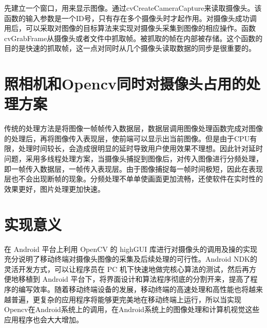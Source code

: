 \documentclass{XDBAthesis}
\begin{document}
先建立一个窗口，用来显示图像。通过cvCreateCameraCapture来读取摄像头。该函数的输入参数是一个ID号，只有存在多个摄像头时才起作用。对摄像头成功调用后，可以采取对图像的目标算法来实现对摄像头采集到图像的相应操作。函数cvGrabFrame从摄像头或者文件中抓取帧。被抓取的帧在内部被存储。这个函数的目的是快速的抓取帧，这一点对同时从几个摄像头读取数据的同步是很重要的。

\section{照相机和Opencv同时对摄像头占用的处理方案}

    传统的处理方法是将图像一帧帧传入数据层，数据层调用图像处理函数完成对图像的处理后，再将图像传入表现层，使前端可以显示出当前图像。但是由于CPU有限，处理时间较长，会造成很明显的延时导致用户使用效果不理想。因此针对延时问题，采用多线程处理方案，当摄像头捕捉到图像后，对传入图像进行分频处理，即一帧传入数据层，一帧传入表现层。由于图像捕捉每一帧时间极短，因此在表现层也不会出现断帧的现象。分频处理不单单使画面更加流畅，还使软件在实时性的效果更好，图片处理更加快速。

\section{实现意义}

   在 Android 平台上利用 OpenCV 的 highGUI 库进行对摄像头的调用及操的实现充分说明了移动终端对摄像头图像的采集及后续处理的可行性。Android NDK的灵活开发方式，可以让程序员在 PC 机下快速地做完核心算法的测试，然后再方便地移植到 Android 平台下，将界面设计和算法程序彻底的分割开来，提高了程序的编写效率。随着移动终端设备的发展，移动终端的高速处理和高性能也将越来越普遍，更复杂的应用程序将能够更完美地在移动终端上运行，所以当实现Opencv在Android系统上的调用，在Android系统上的图像处理和计算机视觉这些应用程序也会大大增加。

\ifx\allfiles\undefined
%

\end{document}
